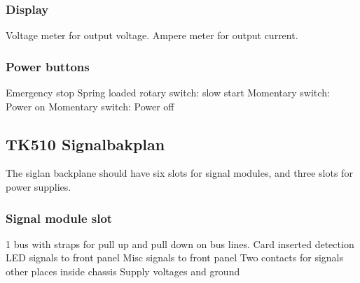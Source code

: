 \subsubsection{Display}
Voltage meter for output voltage.
Ampere meter for output current.

\subsubsection{Power buttons}
Emergency stop
Spring loaded rotary switch: slow start
Momentary switch: Power on
Momentary switch: Power off

\subsection{TK510 Signalbakplan}
The siglan backplane should have six slots for signal modules, and three slots for power supplies.
\subsubsection{Signal module slot}
1 bus with straps for pull up and pull down on bus lines.
Card inserted detection
LED signals to front panel
Misc signals to front panel
Two contacts for signals other places inside chassis
Supply voltages and ground